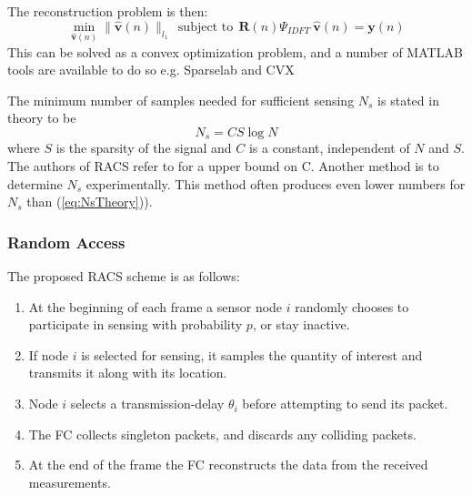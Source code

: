 \documentclass[Main]{subfiles}
\begin{document}
			The reconstruction problem is then:
			\begin{equation}
				\min_{\mathbf{\hat{v}}(n)} 
					\|\mathbf{\hat{v}}(n)\|_{l_1} 
					\ \ \text{subject to} \ \ 
					\mathbf{R}(n) \Psi_{IDFT}\ \mathbf{\hat{v}}(n) = \mathbf{y}(n)
			\end{equation}
			This can be solved as a convex optimization problem, and a number of MATLAB tools are available to do so e.g. Sparselab \cite{SparseLab:Online} and CVX \cite{CVX:Online}

			The minimum number of samples needed for sufficient sensing $N_s$ is stated in theory to be
			\begin{equation}
				N_s = CS \log{N}
				\label{eq:NsTheory} 
			\end{equation}
			where $S$ is the sparsity of the signal and $C$ is a constant, independent of $N$ and $S$.
			The authors of RACS refer to \cite{Candes2006} for a upper bound on C.
			Another method is to determine $N_s$ experimentally.
			This method often produces even lower numbers for $N_s$ than (\ref{eq:NsTheory})).
			\fxnote{insert figure}
		


		\subsubsection{Random Access} %
		\label{sub:random_access}

			The proposed RACS scheme is as follows:

			\begin{enumerate}[label=\bfseries Step \arabic*:]
				\item 
					At the beginning of each frame a sensor node $i$ randomly chooses to participate in sensing with probability $p$, or stay inactive.
				\item 
					If node $i$ is selected for sensing, it samples the quantity of interest and transmits it along with its location.
				\item
					Node $i$ selects a transmission-delay $\theta_{i}$ before attempting to send its packet.
				\item
					The FC collects singleton packets, and discards any colliding packets.
				\item
					At the end of the frame the FC reconstructs  the data from the received measurements.

			\end{enumerate}
\end{document}
